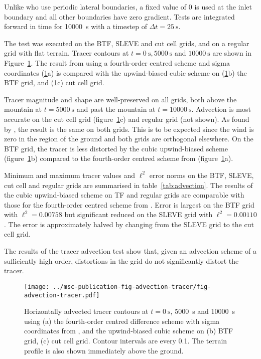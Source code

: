 \documentclass[twocol]{ametsoc}
\begin{document}
Unlike \citet{schaer2002} who use periodic lateral boundaries, a fixed value of 0 is used at the inlet boundary and all other boundaries have zero gradient.
Tests are integrated forward in time for \SI{10000}{\second} with a timestep of \(\Delta t = \SI{25}{\second}\).

The test was executed on the BTF, SLEVE and cut cell grids, and on a regular grid with flat terrain.  Tracer contours at \(t = \SI{0}{\second}, \SI{5000}{\second}\) and \(\SI{10000}{\second}\) are shown in Figure~\ref{fig:advection-tracer}.  The result from \citet{schaer2002} using a fourth-order centred scheme and sigma coordinates (\ref{fig:advection-tracer}a) is compared with the upwind-biased cubic scheme on (\ref{fig:advection-tracer}b) the BTF grid, and (\ref{fig:advection-tracer}c) cut cell grid.

Tracer magnitude and shape are well-preserved on all grids, both above the mountain at \(t = \SI{5000}{\second}\) and past the mountain at \(t = \SI{10000}{\second}\).  Advection is most accurate on the cut cell grid (figure~\ref{fig:advection-tracer}c) and regular grid (not shown).  As found by \citet{good2014}, the result is the same on both grids.  This is to be expected since the wind is zero in the region of the ground and both grids are orthogonal elsewhere.  On the BTF grid, the tracer is less distorted by the cubic upwind-biased scheme (figure~\ref{fig:advection-tracer}b) compared to the fourth-order centred scheme from \citet{schaer2002} (figure~\ref{fig:advection-tracer}a).

Minimum and maximum tracer values and \(\ell^2\) error norms on the BTF, SLEVE, cut cell and regular grids are summarised in table~\ref{tab:advection}.  The results of the cubic upwind-biased scheme on TF and regular grids are comparable with those for the fourth-order centred scheme from \citet{schaer2002}.  Error is largest on the BTF grid with \(\ell^2 = \num{0.00758}\) but significant reduced on the SLEVE grid with \(\ell^2 = \num{0.00110}\).  The error is approximately halved by changing from the SLEVE grid to the cut cell grid.

The results of the tracer advection test show that, given an advection scheme of a sufficiently high order, distortions in the grid do not significantly distort the tracer.

\begin{figure}
	\centering
	\texttt{[image: ../msc-publication-fig-advection-tracer/fig-advection-tracer.pdf]}
%
	\caption{Horizontally advected tracer contours at \(t = \SI{0}{\second}\), \SI{5000}{\second} and \SI{10000}{\second} using (a) the fourth-order centred difference scheme with sigma coordinates from \citet{schaer2002}, and the upwind-biased cubic scheme on (b) BTF grid, (c) cut cell grid.  Contour intervals are every 0.1.  The terrain profile is also shown immediately above the ground.}
	\label{fig:advection-tracer}
\end{figure}
\end{document}
